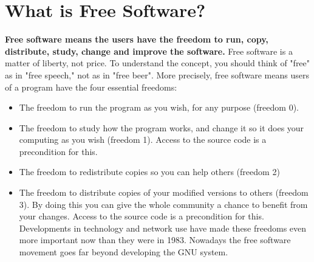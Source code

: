 \documentclass[12pt,a4paper]{article}
\begin{document}
\section{What is Free Software?}
\textbf{Free software means the users have the freedom to run, copy, distribute, study, 
change and improve the software.}
Free software is a matter of liberty, not price. To understand the concept, you should 
think of "free" as in "free speech," not as in "free beer". More precisely, free software 
means users of a program have the four essential freedoms:
\begin{itemize}
\item The freedom to run the program as you wish, for any purpose (freedom 0).
\item The freedom to study how the program works, and change it so it does your
computing as you wish (freedom 1). Access to the source code is a precondition for this.
\item The freedom to redistribute copies so you can help others (freedom 2)
\item The freedom to distribute copies of your modified versions to others (freedom 3). 
By doing this you can give the whole community a chance to benefit from your changes. 
Access to the source code is a precondition for this.
Developments in technology and network use have made these freedoms even more 
important now than they were in 1983. Nowadays the free software movement goes far 
beyond developing the GNU system. 
\end{itemize}
\end{document}
